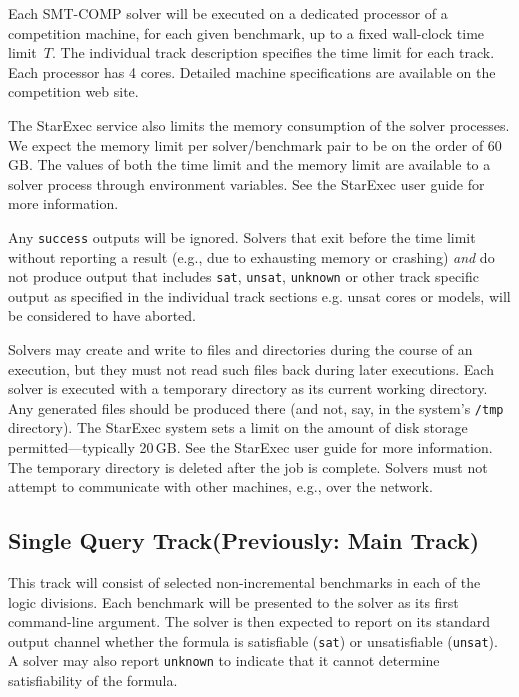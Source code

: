 \documentclass[12pt]{article}
\newcommand{\maintrack}{Single Query Track\xspace}
\begin{document}
%
Each SMT-COMP solver will be executed on a dedicated processor of a
competition machine, for each given benchmark, up to a fixed
wall-clock time limit~$T$. The individual track description specifies
the time limit for each track. Each processor has 4 cores.  Detailed
machine specifications are available on the competition web site.

The StarExec service also limits the memory consumption of the solver
processes.  We expect the memory limit per solver/benchmark pair to be
on the order of 60\,GB.  The values of both the time limit and the
memory limit are available to a solver process through environment
variables.  See the StarExec user guide for more information.

%
Any \texttt{success} outputs will be ignored.  Solvers that exit
before the time limit without reporting a result (e.g., due to
exhausting memory or crashing) \emph{and} do not produce output that
includes \texttt{sat}, \texttt{unsat}, \texttt{unknown} or other track
specific output as specified in the individual track sections e.g. unsat
cores or models, will be considered to have aborted.

%
Solvers may create and write to files and directories during the
course of an execution, but they must not read such files back during
later executions.  Each solver is executed with a temporary directory
as its current working directory.  Any generated files should be
produced there (and not, say, in the system's \texttt{/tmp}
directory).  The StarExec system sets a limit on the amount of disk
storage permitted---typically 20\,GB.  See the StarExec user guide for
more information.  The temporary directory is deleted after the job is
complete.  Solvers must not attempt to communicate with other
machines, e.g., over the network.


\subsection{\maintrack (Previously: Main Track)}
\label{sec:exec:single}

This track will consist of selected non-incremental benchmarks in each of
the logic divisions.  Each benchmark will be presented to the solver as its
first command-line argument.  The solver is then expected to report on its
standard output channel whether the formula is satisfiable (\texttt{sat}) or
unsatisfiable (\texttt{unsat}).  A solver may also report \texttt{unknown} to
indicate that it cannot determine satisfiability of the formula.
\end{document}

